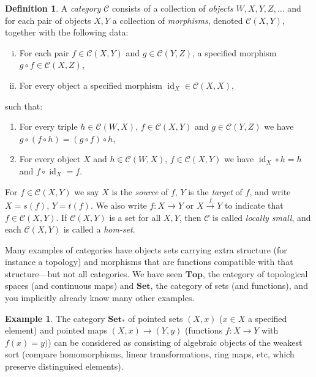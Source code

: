 \documentclass{tufte-handout}
\def\cC {\mathcal{C}}
\def\Set {\mathbf{Set}}
\def\Top {\mathbf{Top}}
\DeclareMathOperator{\id}{id}
\theoremstyle{definition}
\newtheorem{definition}{Definition}
\newtheorem{example}{Example}
\begin{document}
\begin{definition}
A \emph{category} $\cC$ consists of a collection of \emph{objects} $W,X,Y,Z,\ldots$ and for each pair of objects $X,Y$ a collection of \emph{morphisms}, denoted $\cC(X,Y)$, together with the following data:
\begin{enumerate}[i)]
	
	\item For each pair $f\in \cC(X,Y)$ and $g\in \cC(Y,Z)$, a specified morphism $g\circ f\in \cC(X,Z)$,

	\item For every object a specified morphism $\id_X\in\cC(X,X)$,

\end{enumerate}
\noindent
such that:
\begin{enumerate}

	\item For every triple $h\in \cC(W,X)$, $f\in \cC(X,Y)$ and $g\in \cC(Y,Z)$ we have $g\circ(f\circ h) = (g\circ f)\circ h$,

	\item For every object $X$ and $h\in \cC(W,X)$, $f\in \cC(X,Y)$ we have $\id_X\circ h = h$ and $f\circ \id_X = f$.

\end{enumerate}
For $f\in \cC(X,Y)$ we say $X$ is the \emph{source} of $f$, $Y$ is the \emph{target} of 
$f$, and write $X=s(f)$, $Y=t(f)$. We also write $f\colon X\to Y$ or $X\xrightarrow{f} 
Y$ to indicate that $f\in \cC(X,Y)$. If $\cC(X,Y)$ is a set for all $X,Y$, then $\cC$ is called \emph{locally 
small}, and each $\cC(X,Y)$ is called a \emph{hom-set}.
\end{definition}


Many examples of categories have objects sets carrying extra structure (for instance a 
topology) and morphisms that are functions compatible with that structure---but not all 
categories. We have seen $\Top$, the category of topological spaces (and continuous 
maps) and $\Set$, the category of sets (and functions), and you implicitly already 
know
 many other examples.

\begin{example}
The category $\Set_*$ of pointed sets $(X,x)$ ($x\in X$ a specified element) and pointed maps 
$(X,x) \to (Y,y)$ (functions $f\colon X\to Y$ with $f(x) = y)$) can be considered as consisting
of algebraic objects of the weakest sort (compare homomorphisms, linear transformations, ring 
maps, etc, which preserve distinguised elements).
\end{example}
\end{document}
